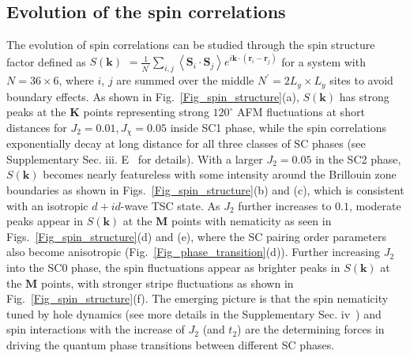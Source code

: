 \documentclass[aps,prx,reprint,superscriptaddress,showpacs]{revtex4-2}
\newcommand{\oim}[1]{{\color{blue} #1}}
\begin{document}
\subsection{Evolution of the spin correlations}
 \label{spin_correlations}
The evolution of spin correlations can be studied through the spin structure factor defined as   $S(\mathbf{k})$ $=\frac{1}{N^{'}}\sum_{i,j}\left \langle \mathbf{S}_{i} \cdot \mathbf{S}_{j} \right \rangle e^{i\mathbf{k}\cdot (\mathbf{r}_{i}-\mathbf{r}_{j})}$ for a system with $N=36\times 6$, where $i$, $j$ are summed over the middle $N^{'}=2L_{y} \times L_{y}$ sites to avoid boundary effects. As shown in Fig.~\ref{Fig_spin_structure}(a),  $S(\mathbf{k})$ has strong peaks at the $\mathbf{K}$ points representing strong $120^{\circ}$ AFM fluctuations at short distances for $J_{2}=0.01,J_{\chi}=0.05$ inside SC1 phase, while the spin correlations exponentially decay at long distance for \oim{ all three classes of SC phases }(see Supplementary Sec. iii. E~\cite{SuppMaterial} for details). With a larger $J_{2}=0.05$ in the SC2 phase, $S(\mathbf{k})$ becomes nearly featureless with some intensity around the Brillouin zone boundaries as shown in Figs.~\ref{Fig_spin_structure}(b) and (c), which is consistent with an isotropic $d+id$-wave TSC state. As $J_{2}$ further increases to $0.1$, moderate peaks appear in $S(\mathbf{k})$ at the $\mathbf{M}$ points with nematicity as seen in Figs.~\ref{Fig_spin_structure}(d) and (e), where the SC pairing order parameters also become anisotropic (Fig.~\ref{Fig_phase_transition}(d)). Further increasing $J_{2}$ into the SC0 phase, the spin fluctuations appear as brighter  peaks in $S(\mathbf{k})$ at the $\mathbf{M}$ points, with stronger stripe fluctuations  as shown in Fig.~\ref{Fig_spin_structure}(f). The emerging picture is that the spin nematicity tuned by hole dynamics (see more details in the Supplementary Sec. iv~\cite{SuppMaterial}) and spin interactions with the increase of $J_{2}$ (and $t_{2}$) are the determining forces in driving the quantum phase transitions between different SC phases.
\end{document}
